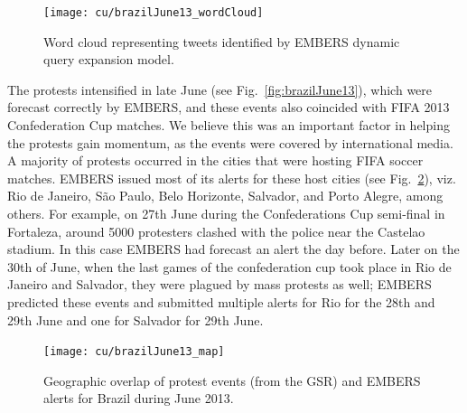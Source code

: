 \begin{figure} %
\centering
\texttt{[image: cu/brazilJune13\_wordCloud]}
\caption{Word cloud representing tweets identified by EMBERS dynamic query expansion model.}
\label{fig:brazilJune13_wordCloud}
\end{figure}

The protests intensified in late June (see Fig.~\ref{fig:brazilJune13}), which were
forecast correctly by EMBERS, and these events
also coincided with FIFA 2013 Confederation Cup matches. We believe this was an important factor in helping
the protests gain momentum,
as the events were covered by international media. A majority of protests
occurred in the cities that were hosting FIFA soccer matches.
EMBERS issued most of its alerts for these host cities (see
Fig.~\ref{fig:brazilJune13_map}), viz.
Rio de Janeiro, São Paulo,
Belo Horizonte, Salvador, and Porto Alegre,
among others. For example, on 27th June during the Confederations Cup
semi-final in Fortaleza, around 5000 protesters clashed with the police
near the Castelao stadium. In this case EMBERS had forecast an alert the
day before. Later on the 30th of June, when the last games of the
confederation cup took place in Rio de Janeiro and Salvador, they
were plagued by mass protests as well; EMBERS predicted these events and
submitted multiple alerts for Rio for the 28th and 29th June and one for
Salvador for 29th June.

\begin{figure} %
\centering
\texttt{[image: cu/brazilJune13\_map]}
\caption{Geographic overlap of protest events (from the GSR) and EMBERS
alerts for Brazil during June 2013.}
\label{fig:brazilJune13_map}
\end{figure}

